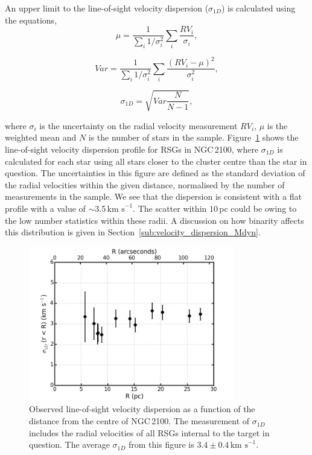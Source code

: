 \documentclass[useAMS,usenatbib]{mn2e}
\def\kms{$\mbox{km s}^{-1}$}
\begin{document}
An upper limit to the line-of-sight velocity dispersion ($\sigma_{1D}$) is calculated using the equations,
\begin{equation}
  \mu = \frac{1}{\sum_{i} 1/\sigma_{i}^{2}} \sum_{i} \frac{RV_{i}}{\sigma_{i}},
\end{equation}

\begin{equation}
Var = \frac{1}{\sum_{i}1/\sigma_{i}^{2}} \sum_{i}\frac{(RV_{i} - \mu)^{2}}{\sigma_{i}^{2}},
\end{equation}

\begin{equation}
  \sigma_{1D} = \sqrt{Var \frac{N}{N - 1}},
\end{equation}

\noindent where $\sigma_{i}$ is the uncertainty on the radial velocity measurement $RV_{i}$, $\mu$ is the weighted mean and $N$ is the number of stars in the sample.
Figure~\ref{fig:sig1d} shows the line-of-sight velocity dispersion profile for RSGs in NGC\,2100,
where $\sigma_{1D}$ is calculated for each star using all stars closer to the cluster centre than the star in question.
The uncertainties in this figure are defined as the standard deviation of the radial velocities within the given distance, normalised by the number of measurements in the sample.
We see that the dispersion is consistent with a flat profile with a value of $\sim$3.5\,\kms.
The scatter within $10\,$pc could be owing to the low number statistics within these radii.
A discussion on how binarity affects this distribution is given in Section~\ref{sub:velocity_dispersion_Mdyn}.


\begin{figure}
 \includegraphics[width=9.0cm]{NGC2100-sig1d-v8}
 \caption{Observed line-of-sight velocity dispersion as a function of the distance from the centre of NGC\,2100.
 The measurement of $\sigma_{1D}$ includes the radial velocities of all RSGs internal to the target in question.
 The average $\sigma_{1D}$ from this figure is $3.4\pm0.4\,$\kms.
\label{fig:sig1d}
          }
\end{figure}
\end{document}
